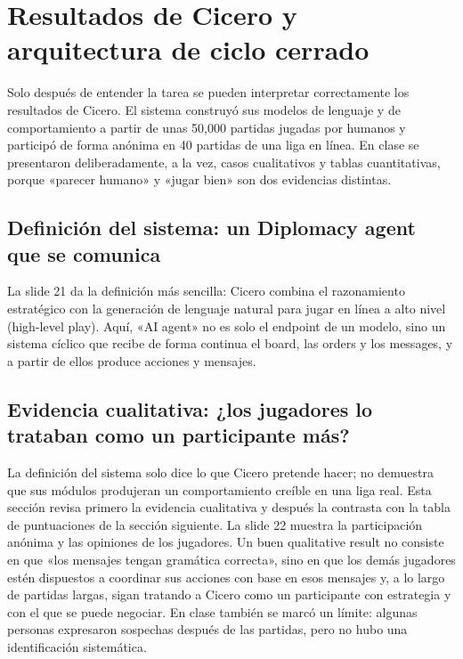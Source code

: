 \section{Resultados de Cicero y arquitectura de ciclo cerrado}

Solo después de entender la tarea se pueden interpretar correctamente los resultados de Cicero. El sistema construyó sus modelos de lenguaje y de comportamiento a partir de unas 50,000 partidas jugadas por humanos y participó de forma anónima en 40 partidas de una liga en línea. En clase se presentaron deliberadamente, a la vez, casos cualitativos y tablas cuantitativas, porque «parecer humano» y «jugar bien» son dos evidencias distintas.

\subsection{Definición del sistema: un Diplomacy agent que se comunica}

La slide 21 da la definición más sencilla: Cicero combina el razonamiento estratégico con la generación de lenguaje natural para jugar en línea a alto nivel (high-level play). Aquí, «AI agent» no es solo el endpoint de un modelo, sino un sistema cíclico que recibe de forma continua el board, las orders y los messages, y a partir de ellos produce acciones y mensajes.


\subsection{Evidencia cualitativa: ¿los jugadores lo trataban como un participante más?}

La definición del sistema solo dice lo que Cicero pretende hacer; no demuestra que sus módulos produjeran un comportamiento creíble en una liga real. Esta sección revisa primero la evidencia cualitativa y después la contrasta con la tabla de puntuaciones de la sección siguiente. La slide 22 muestra la participación anónima y las opiniones de los jugadores. Un buen qualitative result no consiste en que «los mensajes tengan gramática correcta», sino en que los demás jugadores estén dispuestos a coordinar sus acciones con base en esos mensajes y, a lo largo de partidas largas, sigan tratando a Cicero como un participante con estrategia y con el que se puede negociar. En clase también se marcó un límite: algunas personas expresaron sospechas después de las partidas, pero no hubo una identificación sistemática.

